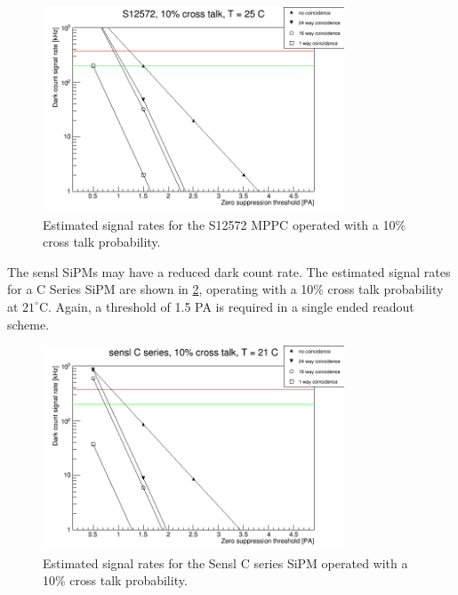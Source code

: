 \documentclass[a4paper]{article}
\begin{document}
\begin{figure}[hp]
    \begin{center}
        \includegraphics[width=0.8\textwidth]{imgs/g_s12572_10pct}
        \caption{Estimated signal rates for the S12572 MPPC operated with a 10\% cross talk probability.}
        \label{rates_s12572_10pct}
    \end{center}
\end{figure}

The sensl SiPMs may have a reduced dark count rate.
The estimated signal rates for a C Series SiPM are shown in \cref{rates_sensl_10pct}, operating with a 10\% cross talk probability at $21^{\circ}$C.
Again, a threshold of 1.5 PA is required in a single ended readout scheme.

\begin{figure}[hp]
    \begin{center}
        \includegraphics[width=0.8\textwidth]{imgs/g_sensl_10pct}
        \caption{Estimated signal rates for the Sensl C series SiPM operated with a 10\% cross talk probability.}
        \label{rates_sensl_10pct}
    \end{center}
\end{figure}
\end{document}
